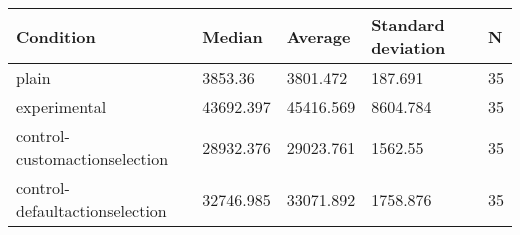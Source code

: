 \begin{center}
\begin{tabular}{|l|l|l|l|l|}
\hline
Condition & Median & Average & Standard deviation & N \\
\hline
plain & 3853.36 & 3801.472 & 187.691 & 35 \\
experimental & 43692.397 & 45416.569 & 8604.784 & 35 \\
control-customactionselection & 28932.376 & 29023.761 & 1562.55 & 35 \\
control-defaultactionselection & 32746.985 & 33071.892 & 1758.876 & 35 \\
\hline
\end{tabular}
\end{center}
